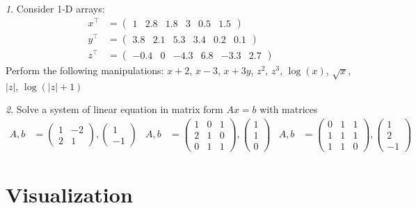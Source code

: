 \documentclass[12pt]{article}
\theoremstyle{remark}
\newtheorem{problem}{}[section]
\begin{document}
\begin{problem}
Consider 1-D arrays:
\begin{align*}
	x^\top &= \begin{pmatrix}
	1 & 2.8 & 1.8 & 3 & 0.5 & 1.5
	\end{pmatrix} \\
	y^\top &= \begin{pmatrix}
	3.8 & 2.1 & 5.3 & 3.4 & 0.2 & 0.1
	\end{pmatrix} \\
	z^\top &= \begin{pmatrix}
	-0.4 & 0 & -4.3 & 6.8 & -3.3 & 2.7
	\end{pmatrix}
\end{align*}
Perform the following manipulations: \(x+2\), \(x-3\), \(x+3y\), \(z^2\), \(z^3\),
\(\log(x)\), \(\sqrt{x}\), \(|z|\), \(\log(|z|+1)\)
\end{problem}

\begin{problem}
Solve a system of linear equation in matrix form \(A x=b\) with matrices
\begin{align*}
	A,b&=\begin{pmatrix}
		1 & -2 \\ 2 & 1
	\end{pmatrix}, \begin{pmatrix}
		1 \\ -1
	\end{pmatrix} & 
	A,b&=\begin{pmatrix}
		1 & 0 & 1 \\ 2 & 1 & 0 \\ 0 & 1 & 1 
	\end{pmatrix}, \begin{pmatrix}
		1 \\ 1 \\ 0
	\end{pmatrix} &
	A,b&=\begin{pmatrix}
		0 & 1 & 1 \\ 1 & 1 & 1 \\ 1 & 1 & 0
	\end{pmatrix}, \begin{pmatrix}
		1 \\ 2 \\ -1
	\end{pmatrix} 
\end{align*}
\end{problem}

\section{Visualization}
\end{document}
